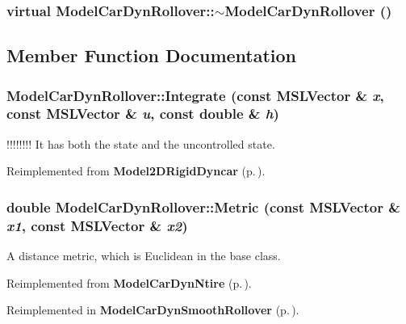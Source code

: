 \subsubsection{\setlength{\rightskip}{0pt plus 5cm}virtual Model\-Car\-Dyn\-Rollover::$\sim$Model\-Car\-Dyn\-Rollover ()\hspace{0.3cm}{\tt  [inline, virtual]}}\label{classModelCarDynRollover_a1}




\subsection{Member Function Documentation}
\subsubsection{ Model\-Car\-Dyn\-Rollover::Integrate (const {\bf MSLVector} \& {\em x}, const {\bf MSLVector} \& {\em u}, const double \& {\em h})\hspace{0.3cm}{\tt  [virtual]}}\label{classModelCarDynRollover_a5}


!!!!!!!! It has both the state and the uncontrolled state.



Reimplemented from {\bf Model2DRigid\-Dyncar} {\rm (p.\,\pageref{classModel2DRigidDyncar_a2})}.
\subsubsection{\setlength{\rightskip}{0pt plus 5cm}double Model\-Car\-Dyn\-Rollover::Metric (const {\bf MSLVector} \& {\em x1}, const {\bf MSLVector} \& {\em x2})\hspace{0.3cm}{\tt  [virtual]}}\label{classModelCarDynRollover_a6}


A distance metric, which is Euclidean in the base class.



Reimplemented from {\bf Model\-Car\-Dyn\-Ntire} {\rm (p.\,\pageref{classModelCarDynNtire_a3})}.

Reimplemented in {\bf Model\-Car\-Dyn\-Smooth\-Rollover} {\rm (p.\,\pageref{classModelCarDynSmoothRollover_a4})}.
